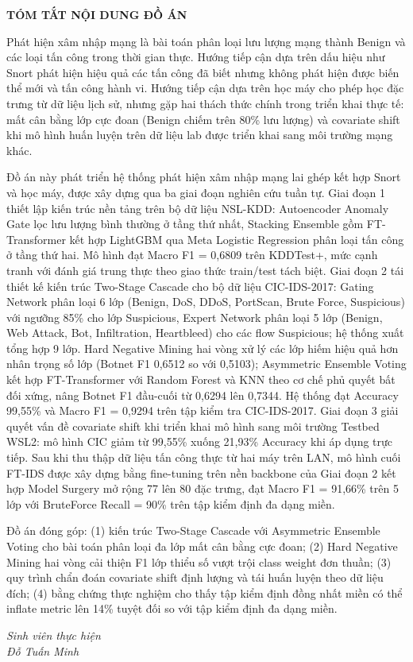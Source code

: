 \documentclass[../DoAn.tex]{subfiles}
\begin{document}
\begin{center}
    \Large{\textbf{TÓM TẮT NỘI DUNG ĐỒ ÁN}}\\
\end{center}
\vspace{1cm}

Phát hiện xâm nhập mạng là bài toán phân loại lưu lượng mạng thành Benign và các loại tấn công trong thời gian thực. Hướng tiếp cận dựa trên dấu hiệu như Snort phát hiện hiệu quả các tấn công đã biết nhưng không phát hiện được biến thể mới và tấn công hành vi. Hướng tiếp cận dựa trên học máy cho phép học đặc trưng từ dữ liệu lịch sử, nhưng gặp hai thách thức chính trong triển khai thực tế: mất cân bằng lớp cực đoan (Benign chiếm trên 80\% lưu lượng) và covariate shift khi mô hình huấn luyện trên dữ liệu lab được triển khai sang môi trường mạng khác.

Đồ án này phát triển hệ thống phát hiện xâm nhập mạng lai ghép kết hợp Snort và học máy, được xây dựng qua ba giai đoạn nghiên cứu tuần tự. Giai đoạn 1 thiết lập kiến trúc nền tảng trên bộ dữ liệu NSL-KDD: Autoencoder Anomaly Gate lọc lưu lượng bình thường ở tầng thứ nhất, Stacking Ensemble gồm FT-Transformer kết hợp LightGBM qua Meta Logistic Regression phân loại tấn công ở tầng thứ hai. Mô hình đạt Macro F1 = 0,6809 trên KDDTest+, mức cạnh tranh với đánh giá trung thực theo giao thức train/test tách biệt. Giai đoạn 2 tái thiết kế kiến trúc Two-Stage Cascade cho bộ dữ liệu CIC-IDS-2017: Gating Network phân loại 6 lớp (Benign, DoS, DDoS, PortScan, Brute Force, Suspicious) với ngưỡng 85\% cho lớp Suspicious, Expert Network phân loại 5 lớp (Benign, Web Attack, Bot, Infiltration, Heartbleed) cho các flow Suspicious; hệ thống xuất tổng hợp 9 lớp. Hard Negative Mining hai vòng xử lý các lớp hiếm hiệu quả hơn nhân trọng số lớp (Botnet F1 0,6512 so với 0,5103); Asymmetric Ensemble Voting kết hợp FT-Transformer với Random Forest và KNN theo cơ chế phủ quyết bất đối xứng, nâng Botnet F1 đầu-cuối từ 0,6294 lên 0,7344. Hệ thống đạt Accuracy 99,55\% và Macro F1 = 0,9294 trên tập kiểm tra CIC-IDS-2017. Giai đoạn 3 giải quyết vấn đề covariate shift khi triển khai mô hình sang môi trường Testbed WSL2: mô hình CIC giảm từ 99,55\% xuống 21,93\% Accuracy khi áp dụng trực tiếp. Sau khi thu thập dữ liệu tấn công thực từ hai máy trên LAN, mô hình cuối FT-IDS được xây dựng bằng fine-tuning trên nền backbone của Giai đoạn 2 kết hợp Model Surgery mở rộng 77 lên 80 đặc trưng, đạt Macro F1 = 91,66\% trên 5 lớp với BruteForce Recall = 90\% trên tập kiểm định đa dạng miền.

Đồ án đóng góp: (1) kiến trúc Two-Stage Cascade với Asymmetric Ensemble Voting cho bài toán phân loại đa lớp mất cân bằng cực đoan; (2) Hard Negative Mining hai vòng cải thiện F1 lớp thiểu số vượt trội class weight đơn thuần; (3) quy trình chẩn đoán covariate shift định lượng và tái huấn luyện theo dữ liệu đích; (4) bằng chứng thực nghiệm cho thấy tập kiểm định đồng nhất miền có thể inflate metric lên 14\% tuyệt đối so với tập kiểm định đa dạng miền.

\vspace{1.5cm}
\begin{flushright}
\textit{Sinh viên thực hiện}\\[1.5cm]
\textit{Đỗ Tuấn Minh}
\end{flushright}
\end{document}

